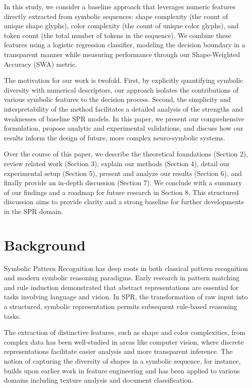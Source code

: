 \documentclass{article}
\begin{document}
In this study, we consider a baseline approach that leverages numeric features directly extracted from symbolic sequences: shape complexity (the count of unique shape glyphs), color complexity (the count of unique color glyphs), and token count (the total number of tokens in the sequence). We combine these features using a logistic regression classifier, modeling the decision boundary in a transparent manner while measuring performance through our Shape-Weighted Accuracy (SWA) metric.

The motivation for our work is twofold. First, by explicitly quantifying symbolic diversity with numerical descriptors, our approach isolates the contributions of various symbolic features to the decision process. Second, the simplicity and interpretability of the method facilitates a detailed analysis of the strengths and weaknesses of baseline SPR models. In this paper, we present our comprehensive formulation, propose analytic and experimental validations, and discuss how our results inform the design of future, more complex neuro-symbolic systems.

Over the course of this paper, we describe the theoretical foundations (Section 2), review related work (Section 3), explain our methods (Section 4), detail our experimental setup (Section 5), present and analyze our results (Section 6), and finally provide an in-depth discussion (Section 7). We conclude with a summary of our findings and a roadmap for future research in Section 8. This structured discussion aims to provide clarity and a strong baseline for further developments in the SPR domain.

\section{Background}
Symbolic Pattern Recognition has deep roots in both classical pattern recognition and modern symbolic reasoning paradigms. Early research in pattern matching and rule induction demonstrated that abstract representations are essential for tasks involving language and vision. In SPR, the transformation of raw input into a structured, symbolic representation permits subsequent rule-based reasoning tasks. 

The extraction of distinctive features, such as shape and color complexities, from complex data has been well-studied in areas like computer vision, where discrete representations facilitate easier analysis and more transparent inference. The notion of capturing the diversity of shapes in a symbolic sequence, for instance, builds upon earlier work in feature engineering and has been applied to various domains including texture analysis and document classification.
\end{document}
